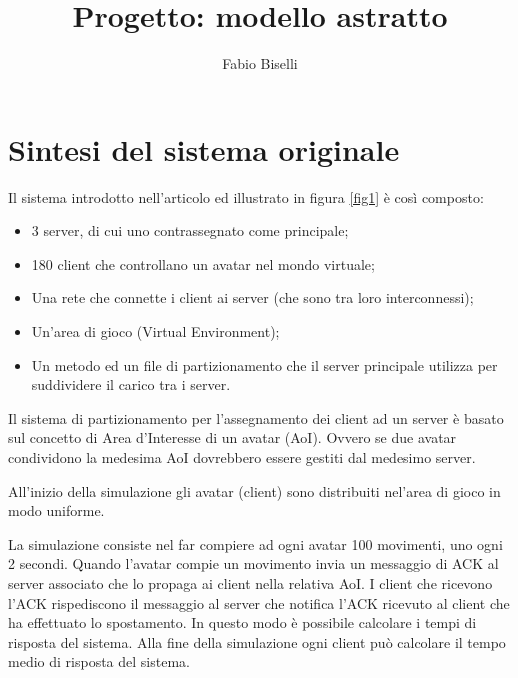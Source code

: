 \documentclass{article}
\author{Fabio Biselli}
\title{Progetto: modello astratto}
\date{}
\begin{document}
\maketitle

\section{Sintesi del sistema originale}
Il sistema introdotto nell'articolo ed illustrato in figura \ref{fig1}
è così composto:
\begin{itemize}
\item
3 server, di cui uno contrassegnato come principale;
\item
180 client che controllano un avatar nel mondo virtuale;
\item
Una rete che connette i client ai server (che sono tra loro interconnessi);
\item
Un'area di gioco (Virtual Environment);
\item
Un metodo ed un file di partizionamento che il server principale utilizza per
suddividere il carico tra i server.
\end{itemize}

Il sistema di partizionamento per l'assegnamento dei client ad un server è
basato sul concetto di Area d'Interesse di un avatar (AoI). Ovvero se due
avatar condividono la medesima AoI dovrebbero essere gestiti dal medesimo
server.

All'inizio della simulazione gli avatar (client) sono distribuiti nel'area
di gioco in modo uniforme.  

La simulazione consiste nel far compiere ad ogni avatar 100 movimenti, uno
ogni 2 secondi. Quando l'avatar compie un movimento invia un messaggio di
ACK al server associato che lo propaga ai client nella relativa AoI.
I client che ricevono l'ACK rispediscono il messaggio al server che notifica
l'ACK ricevuto al client che ha effettuato lo spostamento. In questo modo è
possibile calcolare i tempi di risposta del sistema.
Alla fine della simulazione ogni client può calcolare il tempo medio di
risposta del sistema.
\end{document}
